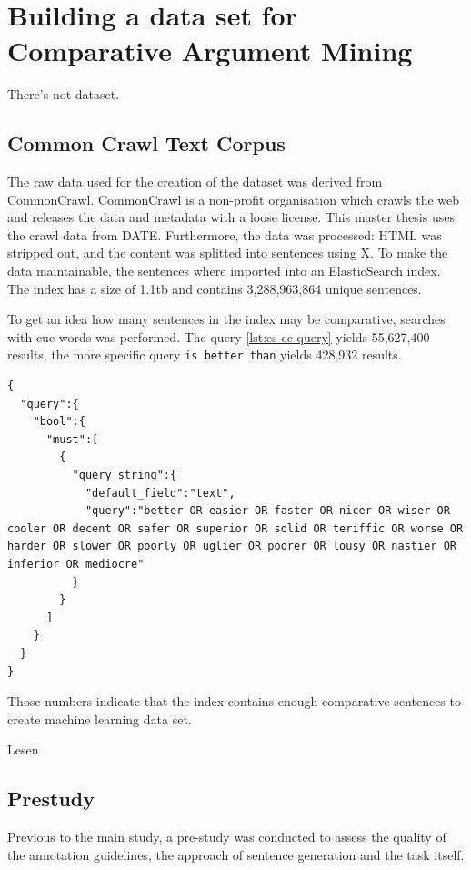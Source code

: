 \chapter{Building a data set for Comparative Argument Mining}
There's not dataset.
\section{Common Crawl Text Corpus}
The raw data used for the creation of the dataset was derived from CommonCrawl. CommonCrawl is a non-profit organisation which crawls the web and releases the data and metadata with a loose license. This master thesis uses the crawl data from DATE. Furthermore, the data was processed: HTML was stripped out, and the content was splitted into sentences using X. To make the data maintainable, the sentences where imported into an ElasticSearch index. The index has a size of 1.1tb and contains 3,288,963,864 unique sentences.

To get an idea how many sentences in the index may be comparative, searches with cue words was performed. The query \ref{lst:es-cc-query} yields 55,627,400 results, the more specific query \texttt{is better than} yields 428,932 results.

\begin{lstlisting}[label=lst:es-cc-query,breaklines=true,postbreak=\mbox{\textcolor{red}{$\hookrightarrow$}\space},caption=Candidates for Comparative Sentences]
{
  "query":{
    "bool":{
      "must":[
        {
          "query_string":{
            "default_field":"text",
            "query":"better OR easier OR faster OR nicer OR wiser OR cooler OR decent OR safer OR superior OR solid OR teriffic OR worse OR harder OR slower OR poorly OR uglier OR poorer OR lousy OR nastier OR inferior OR mediocre"
          }
        }
      ]
    }
  }
}
\end{lstlisting}

Those numbers indicate that the index contains enough comparative sentences to create machine learning data set.

Lesen \cite{Panchenko:2017aa}

\section{Prestudy}
Previous to the main study, a pre-study was conducted to assess the quality of the annotation guidelines, the approach of sentence generation and the task itself.


